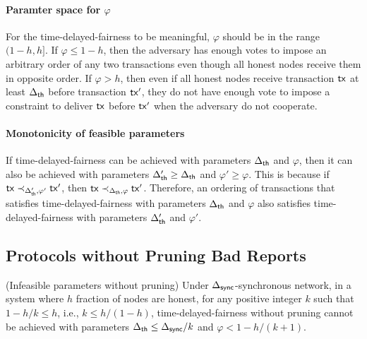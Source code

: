 \paragraph{Paramter space for $\varphi$} For the time-delayed-fairness to be meaningful, $\varphi$ should be in the range $(1-h, h]$. If $\varphi\leq 1-h$, then the adversary has enough votes to impose an arbitrary order of any two transactions even though all honest nodes receive them in opposite order. If $\varphi>h$, then even if all honest nodes receive transaction $\mathsf{tx}$ at least $\Delta_{\mathsf{th}}$ before transaction $\mathsf{tx}'$, they do not have enough vote to impose a constraint to deliver $\mathsf{tx}$ before $\mathsf{tx}'$ when the adversary do not cooperate. 

\paragraph{Monotonicity of feasible parameters} If time-delayed-fairness can be achieved with parameters $\Delta_{\mathsf{th}}$ and $\varphi$, then it can also be achieved with parameters $\Delta_{\mathsf{th}}'\geq \Delta_{\mathsf{th}}$ and $\varphi'\geq \varphi$. This is because if $\mathsf{tx}\prec_{\Delta_{\mathsf{th}}', \varphi'} \mathsf{tx}'$, then $\mathsf{tx}\prec_{\Delta_{\mathsf{th}}, \varphi} \mathsf{tx}'$. Therefore, an ordering of transactions that satisfies time-delayed-fairness with parameters $\Delta_{\mathsf{th}}$ and $\varphi$ also satisfies time-delayed-fairness with parameters $\Delta_{\mathsf{th}}'$ and $\varphi'$. 

\subsection{Protocols without Pruning Bad Reports}

\begin{theorem}{(Infeasible parameters without pruning)}\label{thm:infeasible-no-pruning}
    Under $\Delta_{\mathsf{sync}}$-synchronous network, in a system  where $h$ fraction of nodes are honest, for any positive integer $k$ such that $1-h/k\le h$, i.e., $k\le h/(1-h)$, time-delayed-fairness without pruning cannot be achieved with parameters $\Delta_{\mathsf{th}}\le\Delta_{\mathsf{sync}}/k$ and $\varphi < 1-h/(k+1)$. 
\end{theorem}

